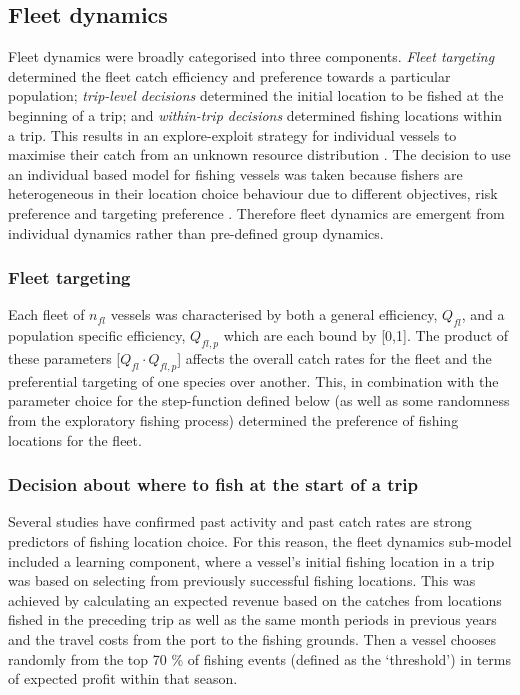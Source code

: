 \documentclass[preprint]{elsarticle}
\begin{document}
\subsection{Fleet dynamics}

Fleet dynamics were broadly categorised into three components. \textit{Fleet
	targeting} determined the fleet catch efficiency and preference towards
a particular population; \textit{trip-level decisions} determined the initial
location to be fished at the beginning of a trip; and \textit{within-trip
	decisions} determined fishing locations within a trip. This results in
an explore-exploit strategy for individual vessels to maximise their catch from
an unknown resource distribution \citep{Bailey2018}. The decision to use an
individual based model for fishing vessels was taken because fishers are
heterogeneous in their location choice behaviour due to different objectives,
risk preference and targeting preference \citep{VanPutten2012a, Boonstra2015}.
Therefore fleet dynamics are emergent from individual dynamics rather than
pre-defined group dynamics. 

\subsubsection{Fleet targeting}

Each fleet of \textit{$n_{fl}$} vessels was characterised by both a general
efficiency, $Q_{fl}$, and a population specific efficiency, ${Q_{fl, p}}$ which
are each bound by [0,1]. The product of these parameters [$Q_{fl} \cdot Q_{fl,
	p}$] affects the overall catch rates for the fleet and the preferential
targeting of one species over another. This, in combination with the parameter
choice for the step-function defined below (as well as some randomness from the
exploratory fishing process) determined the preference of fishing locations for
the fleet.  

\subsubsection{Decision about where to fish at the start of a trip}

Several studies \citep[for a review see][]{Girardin2016} have confirmed past
activity and past catch rates are strong predictors of fishing location choice.
For this reason, the fleet dynamics sub-model included a learning component,
where a vessel's initial fishing location in a trip was based on selecting from
previously successful fishing locations. This was achieved by calculating an
expected revenue based on the catches from locations fished in the preceding
trip as well as the same month periods in previous years and the travel costs
from the port to the fishing grounds. Then a vessel chooses randomly from the
top 70 \% of fishing events (defined as the `threshold') in terms of expected
profit within that season. 
\end{document}
